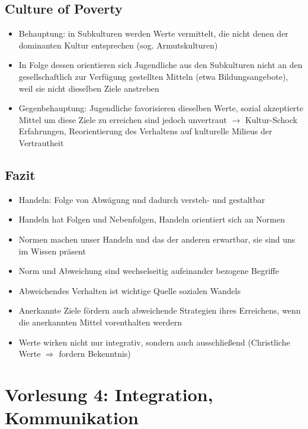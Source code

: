 \documentclass{scrartcl}
\begin{document}
\subsection*{Culture of Poverty}
\begin{itemize}
    \item
        Behauptung: in Subkulturen werden Werte vermittelt, die nicht denen der dominanten Kultur entsprechen (sog. Armutskulturen)
    \item
        In Folge dessen orientieren sich Jugendliche aus den Subkulturen nicht an den gesellschaftlich zur Verfügung gestellten Mitteln (etwa Bildungsangebote), weil sie nicht dieselben Ziele anstreben
    \item
        Gegenbehauptung: Jugendliche favorisieren dieselben Werte, sozial akzeptierte Mittel um diese Ziele zu erreichen sind jedoch unvertraut $\rightarrow$ Kultur-Schock Erfahrungen, Reorientierung des Verhaltens auf kulturelle Milieus der Vertrautheit
\end{itemize}

\subsection*{Fazit}
\begin{itemize}
    \item
        Handeln: Folge von Abwägung und dadurch versteh- und gestaltbar
    \item
        Handeln hat Folgen und Nebenfolgen, Handeln orientiert sich an Normen
    \item
        Normen machen unser Handeln und das der anderen erwartbar, sie sind uns im Wissen präsent
    \item
        Norm und Abweichung sind wechselseitig aufeinander bezogene Begriffe
    \item
        Abweichendes Verhalten ist wichtige Quelle sozialen Wandels
    \item
        Anerkannte Ziele fördern auch abweichende Strategien ihres Erreichens, wenn die anerkannten Mittel vorenthalten werdern
    \item
        Werte wirken nicht nur integrativ, sondern auch ausschließend (Christliche Werte $\Rightarrow$ fordern Bekenntnis)
\end{itemize}

\newpage

\section*{Vorlesung 4: Integration, Kommunikation}
\end{document}
